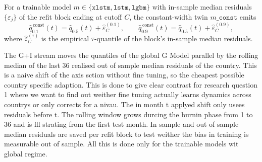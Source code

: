 For a trainable model $m \in \{\texttt{xlstm}, \texttt{lstm}, \texttt{lgbm}\}$
with in-sample median residuals $\{\varepsilon_j\}$ of the refit block ending
at cutoff $C$, the constant-width twin $m\_\texttt{const}$ emits
\begin{equation}
  \hat q^{\,\text{const}}_{0.1}(t) = \hat q_{0.5}(t) + \hat\varepsilon^{(0.1)}_C,
  \qquad
  \hat q^{\,\text{const}}_{0.9}(t) = \hat q_{0.5}(t) + \hat\varepsilon^{(0.9)}_C,
  \label{eq:twins}
\end{equation}
where $\hat\varepsilon^{(\tau)}_C$ is the empirical $\tau$-quantile of the
block's in-sample median residuals.


The G+I stream moves the quantiles of the global G Model parallel by the rolling median of the last 36 realised out of sample median residuals of the country. This is a naive shift of the axis sction without fine tuning, so the cheapest possible country specific adaption. This is done to give clear contrast for research question 1 where we want to find out weither fine tuning actually learns dynamics across countrys or only corrects for a nivau. The in month t applyed shift only usees residuals before t. The rolling window grows durcing the burnin phase from 1 to 36 and is fll strating from the first test month. In sample and out of sample median residuals are saved per refit block to test weither the bias in training is measurable out of sample. All this is done only for the trainable models wit global regime. 

